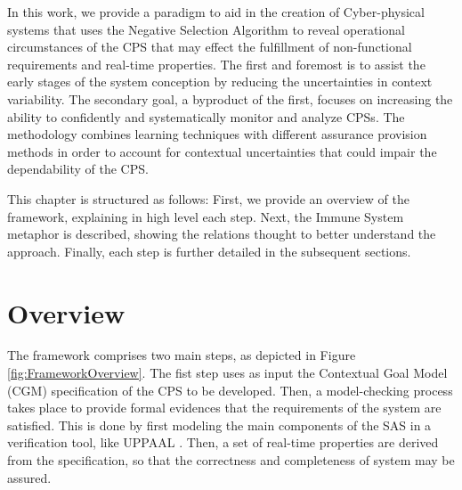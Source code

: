 In this work, we provide a paradigm to aid in the creation of Cyber-physical systems that uses the Negative Selection Algorithm to reveal operational circumstances of the CPS that may effect the fulfillment of non-functional requirements and real-time properties. The first and foremost is to assist the early stages of the system conception by reducing the uncertainties in context variability. The secondary goal, a byproduct of the first, focuses on increasing the ability to confidently and systematically monitor and analyze CPSs. The methodology combines learning techniques with different assurance provision methods in order to account for contextual uncertainties that could impair the dependability of the CPS.


This chapter is structured as follows: First, we provide an overview of the framework, explaining in high level each step. Next, the Immune System metaphor is described, showing the relations thought to better understand the approach. Finally, each step is further detailed in the subsequent sections.




\section{Overview}




The framework comprises two main steps, as depicted in Figure \ref{fig:FrameworkOverview}.
The fist step uses as input the Contextual Goal Model (CGM) specification of the CPS to be developed. Then, a model-checking process takes place to provide formal evidences that the requirements of the system are satisfied. This is done by first modeling the main components of the SAS in a verification tool, like UPPAAL \cite{UPPAAL}. Then, a set of real-time properties are derived from the specification, so that the correctness and completeness of system may be assured. 

